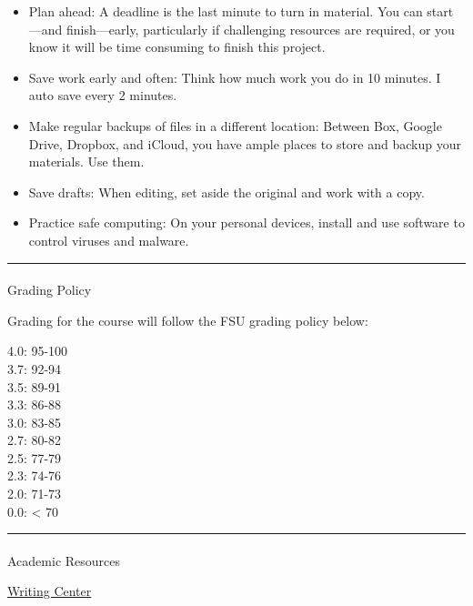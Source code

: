 \documentclass[
  letterpaper,
  DIV=11,
  numbers=noendperiod,
  oneside]{scrartcl}
\makeatletter
\let\oldparagraph\paragraph
\renewcommand{\paragraph}{
    \@ifstar
      \xxxParagraphStar
      \xxxParagraphNoStar
  }
\newcommand{\xxxParagraphStar}[1]{\oldparagraph*{#1}\mbox{}}
\newcommand{\xxxParagraphNoStar}[1]{\oldparagraph{#1}\mbox{}}
\makeatother
\begin{document}
\begin{itemize}
\item
  Plan ahead: A deadline is the last minute to turn in material. You can
  start---and finish---early, particularly if challenging resources are
  required, or you know it will be time consuming to finish this
  project.
\item
  Save work early and often: Think how much work you do in 10 minutes. I
  auto save every 2 minutes.
\item
  Make regular backups of files in a different location: Between Box,
  Google Drive, Dropbox, and iCloud, you have ample places to store and
  backup your materials. Use them.
\item
  Save drafts: When editing, set aside the original and work with a
  copy.
\item
  Practice safe computing: On your personal devices, install and use
  software to control viruses and malware.
\end{itemize}

\begin{center}\rule{0.5\linewidth}{0.5pt}\end{center}

\paragraph{Grading Policy}\label{grading-policy}

Grading for the course will follow the FSU grading policy below:

4.0: 95-100\\
3.7: 92-94\\
3.5: 89-91\\
3.3: 86-88\\
3.0: 83-85\\
2.7: 80-82\\
2.5: 77-79\\
2.3: 74-76\\
2.0: 71-73\\
0.0: \textless{} 70

\begin{center}\rule{0.5\linewidth}{0.5pt}\end{center}

\paragraph{Academic Resources}\label{academic-resources}

\href{http://www.fitchburgstate.edu/offices-services-directory/tutor-center/writing-help/}{Writing
Center}
\end{document}
